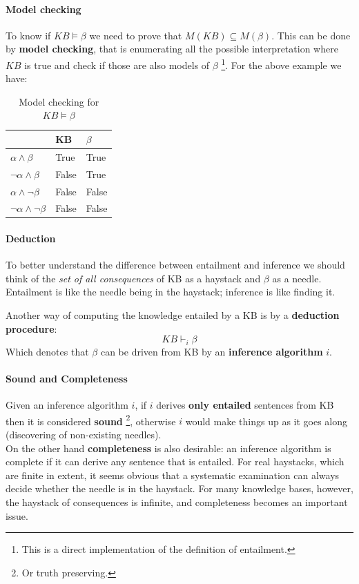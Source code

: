 \documentclass[10pt,a4paper]{article}
\begin{document}
\paragraph{Model checking}
\label{sec:model_checking}
To know if $KB \models \beta$ we need to prove that $M(KB) \subseteq M(\beta)$. This can be done by \textbf{model checking}, that is enumerating all the possible interpretation where $KB$ is true and check if those are also models of $\beta$ \footnote{This is a direct implementation of the definition of entailment.}. For the above example we have:

\begin{table}[H]
\centering
    \begin{tabular}{|l|l|l|}
        \hline
        ~                          & KB    & $\beta$ \\ \hline
        $\alpha \wedge \beta   $         & \cellcolor{blue!25} True  & \cellcolor{blue!25} True  \\ 
        $\neg \alpha \wedge \beta  $   & False & \cellcolor{blue!25} True  \\ 
       $\alpha \wedge \neg \beta  $     & False & False \\ 
        $\neg \alpha \wedge \neg \beta$  & False & False \\
        \hline
    \end{tabular}
    \caption{Model checking for $KB\models\beta$}
\end{table}

\paragraph{Deduction} 
To better understand the difference between entailment and inference we should think of the \textit{set of all consequences} of KB as a haystack and $\beta$ as a needle. Entailment is like the needle being in the haystack; inference is like finding it.

Another way of computing the knowledge entailed by a KB is by a \textbf{deduction procedure}:
\[KB \vdash_i \beta\]
Which denotes that $\beta$ can be driven from KB by an \textbf{inference algorithm} $i$. 

\paragraph{Sound and Completeness} Given an inference algorithm $i$, if $i$ derives \textbf{only entailed} sentences from KB then it is considered \textbf{sound} \footnote{Or truth preserving.}, otherwise $i$ would make things up as it goes along (discovering of non-existing needles).\\
On the other hand \textbf{completeness} is also desirable: an inference algorithm is complete if it can derive any sentence that is entailed. For real haystacks, which are finite in extent, it seems obvious that a systematic examination can always decide whether the needle is in the haystack. For many knowledge bases, however, the haystack of consequences is infinite, and completeness becomes an important issue.
\end{document}
